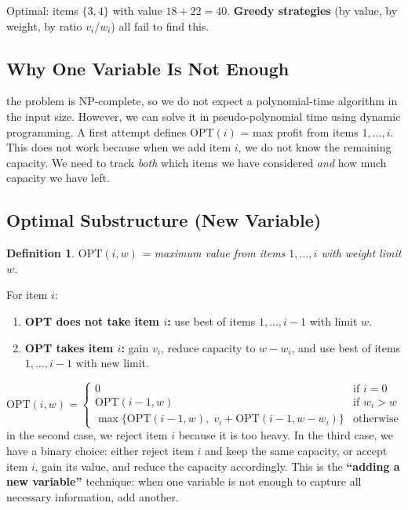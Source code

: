 \documentclass[12pt,a4paper]{report}
\newtheorem{definition}{Definition}
\begin{document}
Optimal: items $\{3, 4\}$ with value $18 + 22 = 40$. \textbf{Greedy strategies}
(by value, by weight, by ratio $v_i/w_i$) all fail to find this.

\subsection{Why One Variable Is Not Enough}
 the problem is NP-complete, so we do not expect a polynomial-time algorithm in the input size. However, we can solve it in pseudo-polynomial time using dynamic programming.
 \newline
A first attempt defines $\text{OPT}(i)$ = max profit from items $1, \ldots, i$. This does
not work because when we add item $i$, we do not know the remaining capacity. We need to
track \emph{both} which items we have considered \emph{and} how much capacity we have left.

\subsection{Optimal Substructure (New Variable)}

\begin{definition}
$\text{OPT}(i, w)$ = maximum value from items $1, \ldots, i$ with weight limit $w$.
\end{definition}

For item $i$:
\begin{enumerate}
    \item \textbf{OPT does not take item $i$:} use best of items $1, \ldots, i-1$ with limit $w$.
    \item \textbf{OPT takes item $i$:} gain $v_i$, reduce capacity to $w - w_i$, and use best
    of items $1, \ldots, i-1$ with new limit.
\end{enumerate}

\[
    \text{OPT}(i, w) =
    \begin{cases}
        0 & \text{if } i = 0 \\
        \text{OPT}(i-1, w) & \text{if } w_i > w \\
        \max\bigl\{\text{OPT}(i-1, w),\; v_i + \text{OPT}(i-1, w - w_i)\bigr\}
        & \text{otherwise}
    \end{cases}
\]
in the second case, we reject item $i$ because it is too heavy. In the third case, we have a binary choice: either reject item $i$ and keep the same capacity, or accept item $i$, gain its value, and reduce the capacity accordingly.
This is the \textbf{``adding a new variable''} technique: when one variable is not enough
to capture all necessary information, add another.
\end{document}
